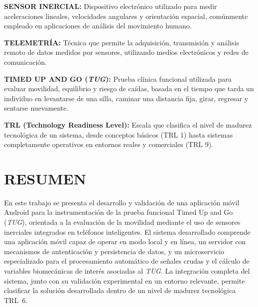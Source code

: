 \documentclass[12pt]{report}
\begin{document}
\begin{justify}
    \noindent \textbf{SENSOR INERCIAL:} Dispositivo electrónico utilizado para medir aceleraciones lineales, velocidades angulares y orientación espacial, comúnmente empleado en aplicaciones de análisis del movimiento humano.
    \vspace{0.3cm}

    \noindent \textbf{TELEMETRÍA:} Técnica que permite la adquisición, transmisión y análisis remoto de datos medidos por sensores, utilizando medios electrónicos y redes de comunicación.
    \vspace{0.3cm}

    \noindent \textbf{TIMED UP AND GO (\textit{TUG}):} Prueba clínica funcional utilizada para evaluar movilidad, equilibrio y riesgo de caídas, basada en el tiempo que tarda un individuo en levantarse de una silla, caminar una distancia fija, girar, regresar y sentarse nuevamente.
    \vspace{0.3cm}

    \noindent \textbf{TRL (Technology Readiness Level):} Escala que clasifica el nivel de madurez tecnológica de un sistema, desde conceptos básicos (TRL 1) hasta sistemas completamente operativos en entornos reales y comerciales (TRL 9).
    \vspace{0.3cm}




    \clearpage

    {
        \centering \section*{RESUMEN}
    }

    En este trabajo se presenta el desarrollo y validación de una aplicación móvil Android para la instrumentación de la prueba funcional Timed Up and Go (\textit{TUG}), orientada a la evaluación de la movilidad mediante el uso de sensores inerciales integrados en teléfonos inteligentes. El sistema desarrollado comprende una aplicación móvil capaz de operar en modo local y en línea, un servidor con mecanismos de autenticación y persistencia de datos, y un microservicio especializado para el procesamiento automático de señales crudas y el cálculo de variables biomecánicas de interés asociadas al \textit{TUG}. La integración completa del sistema, junto con su validación experimental en un entorno relevante, permite clasificar la solución desarrollada dentro de un nivel de madurez tecnológica TRL~6.\\


\end{justify}
\end{document}
